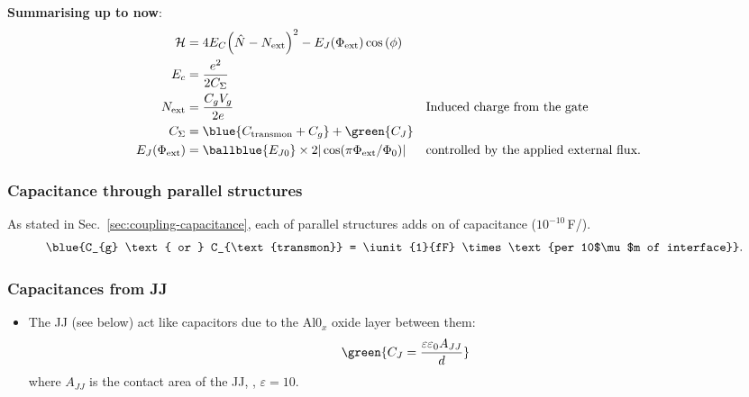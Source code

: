 \newpage
\begin{framed}\noindent
  \textbf{Summarising up to now}:
  \begin{equation}\label{eq:cooper-pair-box-summary}
    \begin{aligned}
      \mathcal{H} & = 4E_C{\left(\hat{N}-N_\text{ext}\right)^2} -
      E_J(\Phi_{\text{ext}})\cos\left(\phi\right)\\
      E_c& = \frac{e^2}{2C_\Sigma}\\
      N_\text{ext} & = \frac{C_g V_g}{2e} && \text{Induced charge from the gate}\\
      C_{\Sigma} & = \blue{C_\text{transmon} + C_g}+ \green{C_J}\\
      E_J(\Phi_{\text{ext}}) & = \ballblue{E_{J0}} \times 2|\cos(\pi\Phi_\text{ext}/\Phi_0)| && \text{controlled by the applied external flux}.\\
    \end{aligned}
  \end{equation}

  \subsubsection{Capacitance through parallel structures}
  \label{sec:capac-thro-parall}
  As    stated     in    Sec.~\ref{sec:coupling-capacitance},    each
   of parallel structures  adds on  of
  capacitance ($10^{-10}\,$F/\mum).
  \begin{equation}
    \blue{C_{g} \text{ or } C_{\text{transmon}} = \iunit{1}{fF} \times \text{per 10$\mu$m of interface}}.
  \end{equation}

\begin{center}
\end{center}

\subsubsection{Capacitances from JJ}
\label{sec:capacitances-from-jj}
\begin{itemize}
\item The JJ (see below) act like capacitors due to the Al0$_x$ oxide
  layer between them:
  \begin{equation}
    \green{C_J = \frac{\varepsilon\varepsilon_0A_{JJ}}{d}}
  \end{equation}
  \noindent  where   $A_{JJ}$  is  the   contact  area  of   the  JJ,
  , $\varepsilon = 10$.


\end{itemize}
\end{framed}
